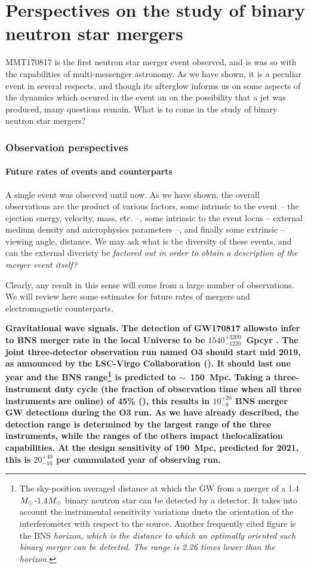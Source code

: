 
\part{Perspectives on the study of binary neutron star mergers}

MMT170817 is the first neutron star merger event observed, and is was so with the capabilities of multi-messenger astronomy. As we have shown, it is a peculiar event in several respects, and though its afterglow informs us on some aspects of the dynamics which occured in the event an on the possibility that a jet was produced, many questions remain. What is to come in the study of binary neutron star mergers?

\section{Observation perspectives}
\subsection{Future rates of events and counterparts}

A single event was observed until now. As we have shown, the overall observations are the product of various factors, some intrinsic to the event -- the ejection energy, velocity, mass, etc. --, some intrinsic to the event locus -- external medium density and microphysics parameters --, and finally some extrinsic -- viewing angle, distance. We may ask what is the diversity of these events, and can the external diveristy be \it{factored out} in order to obtain a description of the merger event itself?

Clearly, any result in this sense will come from a large number of observations. We will review here some estimates for future rates of mergers and electromagnetic counterparts.

\bf{Gravitational wave signals.} The detection of GW170817 allowsto infer to BNS merger rate in the local Universe to be $1540^{+3200}_{-1220}$~Gpcyr \cite{37}. The joint three-detector observation run named O3  should start mid 2019, as announced by the LSC-Virgo Collaboration (\cite{54}). It should last one year and the BNS range\footnote{The sky-position averaged distance at which the GW from a merger of a 1.4$M_{\odot}$-1.4$M_{\odot}$ binary neutron star can be detected by a detector. It takes into account the instrumental sensitivity variations dueto the orientation of the interferometer with respect to the source. Another frequently cited figure is the BNS \it{horizon}, which is the distance to which an  optimally oriented such binary merger can be detected. The range is 2.26 times lower than the horizon.} is predicted to $\sim$~150~Mpc. Taking a three-instrument duty cycle (the fraction of observation time when all three instruments are online) of 45\% (\cite{54}), this results in $10^{+20}_{-8}$ BNS merger GW detections during the O3 run. As we have already described, the detection range is determined by the largest range of the three instruments, while the ranges of the others impact thelocalization capabilities.
At the design sensitivity of 190~Mpc, predicted for 2021, this is $20^{+40}_{-16}$ per cummulated year of observing run.

